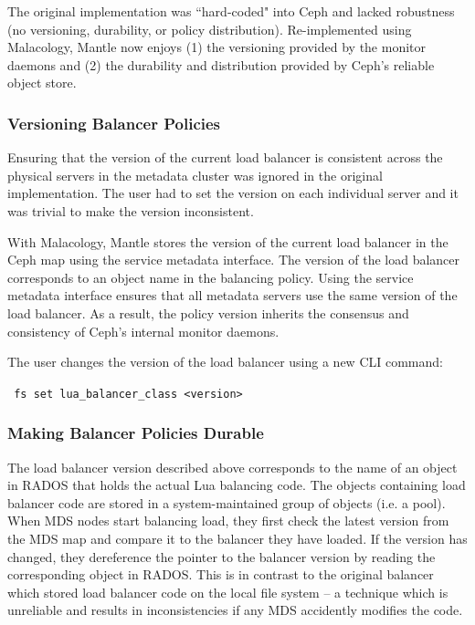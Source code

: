 \documentclass[preprint]{sigplanconf-eurosys}
\begin{document}
The original implementation was ``hard-coded" into Ceph and lacked robustness
(no versioning, durability, or policy distribution).  Re-implemented using
Malacology, Mantle now enjoys (1) the versioning provided by the monitor
daemons and (2) the durability and distribution provided by Ceph's reliable
object store.  

\subsubsection{Versioning Balancer Policies}

Ensuring that the version of the current load balancer is consistent across the
physical servers in the metadata cluster was ignored in the original
implementation. The user had to set the version on each individual server and
it was trivial to make the version inconsistent.

With Malacology, Mantle stores the version of the current load balancer in the
Ceph map using the service metadata interface. The version of the load balancer
corresponds to an object name in the balancing policy. Using the service
metadata interface ensures that all metadata servers use the same version of
the load balancer. As a result, the policy version inherits the consensus and
consistency of Ceph's internal monitor daemons.

The user changes the version of the load balancer using a new CLI command:

\noindent \texttt{ fs\ set\ lua\_balancer\_class\ \textless{}version\textgreater{}}


\subsubsection{Making Balancer Policies Durable}

The load balancer version described above corresponds to the name of an object
in RADOS that holds the actual Lua balancing code. The objects containing load
balancer code are stored in a system-maintained group of objects (i.e. a pool).
When MDS nodes start balancing load, they first check the latest version from
the MDS map and compare it to the balancer they have loaded. If the version has
changed, they dereference the pointer to the balancer version by reading the
corresponding object in RADOS. This is in contrast to the original balancer
which stored load balancer code on the local file system -- a technique which
is unreliable and results in inconsistencies if any MDS accidently modifies the
code.
\end{document}
